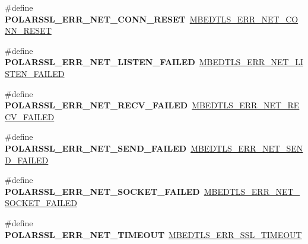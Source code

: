 \begin{DoxyCompactItemize}
\item 
\mbox{\label{compat-1_83_8h_ab25ddd7b1e424e1168226dd268259360}} 
\#define {\bfseries P\+O\+L\+A\+R\+S\+S\+L\+\_\+\+E\+R\+R\+\_\+\+N\+E\+T\+\_\+\+C\+O\+N\+N\+\_\+\+R\+E\+S\+ET}~\mbox{\hyperlink{net__sockets_8h_a1793f099e5c010750c7a07bf259898d9}{M\+B\+E\+D\+T\+L\+S\+\_\+\+E\+R\+R\+\_\+\+N\+E\+T\+\_\+\+C\+O\+N\+N\+\_\+\+R\+E\+S\+ET}}
\item 
\mbox{\label{compat-1_83_8h_a943010f94195f2f283a2b3d6ccea5422}} 
\#define {\bfseries P\+O\+L\+A\+R\+S\+S\+L\+\_\+\+E\+R\+R\+\_\+\+N\+E\+T\+\_\+\+L\+I\+S\+T\+E\+N\+\_\+\+F\+A\+I\+L\+ED}~\mbox{\hyperlink{net__sockets_8h_a4bf7cbe6fff470186e4a7a275dde4bdd}{M\+B\+E\+D\+T\+L\+S\+\_\+\+E\+R\+R\+\_\+\+N\+E\+T\+\_\+\+L\+I\+S\+T\+E\+N\+\_\+\+F\+A\+I\+L\+ED}}
\item 
\mbox{\label{compat-1_83_8h_a03130c59c475bf1e8a89cf97c28972c6}} 
\#define {\bfseries P\+O\+L\+A\+R\+S\+S\+L\+\_\+\+E\+R\+R\+\_\+\+N\+E\+T\+\_\+\+R\+E\+C\+V\+\_\+\+F\+A\+I\+L\+ED}~\mbox{\hyperlink{net__sockets_8h_a0c95b85b300ddc10a753899ff2f154f2}{M\+B\+E\+D\+T\+L\+S\+\_\+\+E\+R\+R\+\_\+\+N\+E\+T\+\_\+\+R\+E\+C\+V\+\_\+\+F\+A\+I\+L\+ED}}
\item 
\mbox{\label{compat-1_83_8h_a6a6129076b6fefa2d730b9173710f1fe}} 
\#define {\bfseries P\+O\+L\+A\+R\+S\+S\+L\+\_\+\+E\+R\+R\+\_\+\+N\+E\+T\+\_\+\+S\+E\+N\+D\+\_\+\+F\+A\+I\+L\+ED}~\mbox{\hyperlink{net__sockets_8h_ad11d72cca1319fd35fb9e73c9428e92d}{M\+B\+E\+D\+T\+L\+S\+\_\+\+E\+R\+R\+\_\+\+N\+E\+T\+\_\+\+S\+E\+N\+D\+\_\+\+F\+A\+I\+L\+ED}}
\item 
\mbox{\label{compat-1_83_8h_aec186e276d741e5aad9d8b4cd7ab0efd}} 
\#define {\bfseries P\+O\+L\+A\+R\+S\+S\+L\+\_\+\+E\+R\+R\+\_\+\+N\+E\+T\+\_\+\+S\+O\+C\+K\+E\+T\+\_\+\+F\+A\+I\+L\+ED}~\mbox{\hyperlink{net__sockets_8h_aa639b33eeaf6414c0de66ab9b8ff6cde}{M\+B\+E\+D\+T\+L\+S\+\_\+\+E\+R\+R\+\_\+\+N\+E\+T\+\_\+\+S\+O\+C\+K\+E\+T\+\_\+\+F\+A\+I\+L\+ED}}
\item 
\mbox{\label{compat-1_83_8h_af7297aa36523ada16a82660bdbd1b258}} 
\#define {\bfseries P\+O\+L\+A\+R\+S\+S\+L\+\_\+\+E\+R\+R\+\_\+\+N\+E\+T\+\_\+\+T\+I\+M\+E\+O\+UT}~\mbox{\hyperlink{ssl_8h_a2fdb240812860402a1a946eae8264148}{M\+B\+E\+D\+T\+L\+S\+\_\+\+E\+R\+R\+\_\+\+S\+S\+L\+\_\+\+T\+I\+M\+E\+O\+UT}}

\end{DoxyCompactItemize}
